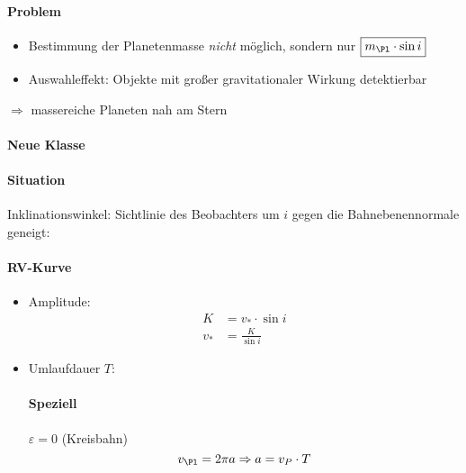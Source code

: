 \paragraph{Problem}
\begin{itemize}
    \item Bestimmung der Planetenmasse \emph{nicht} möglich, sondern nur 
        $\boxed{m_{\Pl} \cdot \sin i}$
    \item Auswahleffekt: Objekte mit großer gravitationaler Wirkung detektierbar
\end{itemize}
$\Rightarrow$ massereiche Planeten nah am Stern

\paragraph{Neue Klasse} 

\paragraph{Situation}

\begin{center}
\end{center}

Inklinationswinkel: Sichtlinie des Beobachters um $i$ gegen die Bahnebenennormale
geneigt:

\paragraph{RV-Kurve}
\begin{itemize}
    \item Amplitude:
        \begin{align*}
            K &= v_* \cdot \sin i \\
            v_* &= \frac{K}{\sin i}
        \end{align*}
    \item Umlaufdauer $T$:
        \paragraph{Speziell} $\varepsilon = 0$ (Kreisbahn)
        \[ v_{\Pl} = 2 \pi a \Rightarrow a = v_P \cdot T \]
\end{itemize}


